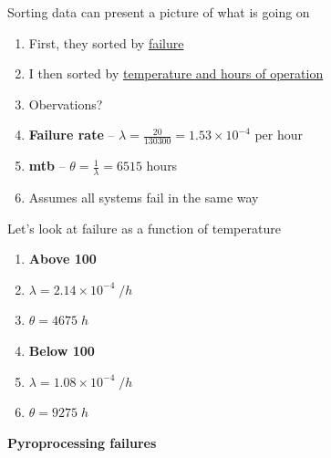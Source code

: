 \documentclass[aspectratio=1610,pdftex,dvipsnames,compress,xcolor={dvipsnames}]{beamer}
\newcommand{\acf}{\acrfull} %
\begin{document}
\addtocounter{framenumber}{-1}
\begin{frame}{Sorting data can present a picture of what is going on}
    \begin{enumerate}[series=outerlist,topsep=0pt,itemsep=17pt,leftmargin=*,label=(\arabic*)]
        \item[]First, they sorted by \href{https://docs.google.com/spreadsheets/d/1iNBowXJOa8Da4_TxbC0iFPxhtJtCSlNWTEF8rtCHdbI/edit?usp=sharing}{failure}
        \item[]I then sorted by \href{https://docs.google.com/spreadsheets/d/1MLsXFbCZcbv1Atahns1xxBUEvodaqZh2DdBCWs13oN4/edit?usp=sharing}{temperature and hours of operation}
        \item[]Obervations?
        \item[]\textbf{Failure rate} -- $\lambda = \frac{20}{130300}=1.53 \times 10^{-4}$ per hour
        \item[]\textbf{\acf{mtb}} -- $\theta = \frac{1}{\lambda} = 6515$ hours 
        \item[]Assumes all systems fail in the same way
    \end{enumerate}
\end{frame}


\begin{frame}{Let's look at failure as a function of temperature}
    \begin{enumerate}[series=outerlist,topsep=0pt,itemsep=7pt,leftmargin=*,label=(\arabic*)]
        \item[]\textbf{Above 100}
        \item[]$\lambda = 2.14 \times 10^{-4} \; /h$
        \item[]$\theta = 4675 \; h$
            \vspace{0.15in}
        \item[]\textbf{Below 100}
        \item[]$\lambda = 1.08 \times 10^{-4} \; /h $
        \item[]$\theta = 9275 \; h$
    \end{enumerate}
\end{frame}


\begin{frame}[plain]{}
    \centering\LARGE\textbf{Pyroprocessing failures}
\end{frame}
\end{document}
